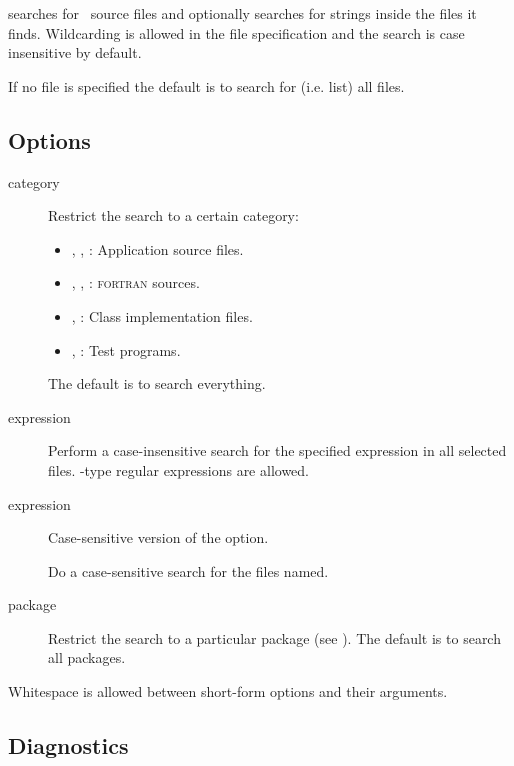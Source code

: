  searches for \aipspp\ source files and optionally searches for
strings inside the files it finds.  Wildcarding is allowed in the file
specification and the search is case insensitive by default.

If no file is specified the default is to search for (i.e. list) all files.

\subsection*{Options}

\begin{description}
\item[ category]
   Restrict the search to a certain category:
   \begin{itemize}
      \item
      , , : Application source files.

      \item
      , , : \textsc{fortran} sources.

      \item
      , : Class implementation files.

      \item
      , : Test programs.
   \end{itemize}
   The default is to search everything.

\item[ expression]
   Perform a case-insensitive search for the specified expression in all
   selected files.  -type regular expressions are allowed.

\item[ expression]
   Case-sensitive version of the  option.

\item[]
   Do a case-sensitive search for the files named.

\item[ package]
   Restrict the search to a particular package (see ).
   The default is to search all packages.
\end{description}

\noindent
Whitespace is allowed between short-form options and their arguments.

\subsection*{Diagnostics}

